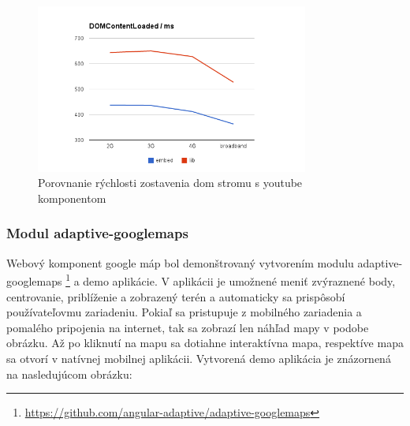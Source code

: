 \begin{figure}[H]
  \centering
  \includegraphics[width=0.8\textwidth]{img/load/youtube-dom.png}
  \caption[Porovnanie rýchlosti zostavenia dom stromu s youtube komponentom]{
    Porovnanie rýchlosti zostavenia dom stromu s youtube komponentom}
  \label{fig: youtube-dom}
\end{figure}


\newpage
\subsubsection{Modul adaptive-googlemaps} %
\label{sub:adaptive_googlemaps}

Webový komponent google máp bol demonštrovaný vytvorením modulu adaptive-googlemaps \footnote{\url{https://github.com/angular-adaptive/adaptive-googlemaps}} a demo aplikácie. V aplikácii je umožnené meniť zvýraznené body, centrovanie, priblíženie a zobrazený terén a automaticky sa prispôsobí používateľovmu zariadeniu. Pokiaľ sa pristupuje z mobilného zariadenia a pomalého pripojenia na internet, tak sa zobrazí len náhľad mapy v podobe obrázku. Až po kliknutí na mapu sa dotiahne interaktívna mapa, respektíve mapa sa otvorí v natívnej mobilnej aplikácii. Vytvorená demo aplikácia je znázornená na nasledujúcom obrázku:

